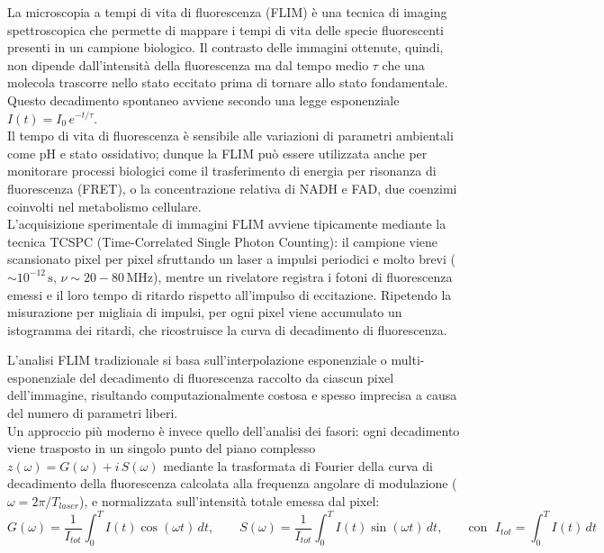 \documentclass[a4paper, 11pt]{article}
\begin{document}
La microscopia a tempi di vita di fluorescenza (FLIM) è una tecnica di imaging spettroscopica che permette di mappare i tempi di vita delle specie fluorescenti presenti in un campione biologico. Il contrasto delle immagini ottenute, quindi, non dipende dall'intensità della fluorescenza ma dal tempo medio $\tau$ che una molecola trascorre nello stato eccitato prima di tornare allo stato fondamentale. Questo decadimento spontaneo avviene secondo una legge esponenziale $I(t)=I_0\,e^{-t/\tau}$.\\
Il tempo di vita di fluorescenza è sensibile alle variazioni di parametri ambientali come pH e stato ossidativo; dunque la FLIM può essere utilizzata anche per monitorare processi biologici come il trasferimento di energia per risonanza di fluorescenza (FRET), o la concentrazione relativa di NADH e FAD, due coenzimi coinvolti nel metabolismo cellulare.\\
L'acquisizione sperimentale di immagini FLIM avviene tipicamente mediante la tecnica TCSPC (Time-Correlated Single Photon Counting): il campione viene scansionato pixel per pixel sfruttando un laser a impulsi periodici e molto brevi ($\sim10^{-12}\,\text{s}$, $\nu \sim 20-80\,\text{MHz}$), mentre un rivelatore registra i fotoni di fluorescenza emessi e il loro tempo di ritardo rispetto all'impulso di eccitazione.
Ripetendo la misurazione per migliaia di impulsi, per ogni pixel viene accumulato un istogramma dei ritardi, che ricostruisce la curva di decadimento di fluorescenza.

L'analisi FLIM tradizionale si basa sull'interpolazione esponenziale o multi-esponenziale del decadimento di fluorescenza raccolto da ciascun pixel dell'immagine, risultando computazionalmente costosa e spesso imprecisa a causa del numero di parametri liberi.\\
Un approccio più moderno è invece quello dell'analisi dei fasori: ogni decadimento viene trasposto in un singolo punto del piano complesso $z(\omega) = G(\omega) + i\,S(\omega)$ mediante la trasformata di Fourier della curva di decadimento della fluorescenza calcolata alla frequenza angolare di modulazione ($\omega =2\pi/T_{laser}$), e normalizzata sull'intensità totale emessa dal pixel:
\vspace{-5pt}
\[
G(\omega) = \frac{1}{I_{tot}} \int_0^{T} I(t) \cos(\omega t)\,dt, \qquad 
S(\omega) = \frac{1}{I_{tot}} \int_0^{T} I(t) \sin(\omega t)\,dt, \qquad 
\text{con }\;I_{tot} = \int_0^{T} I(t)\,dt
\]
\vspace{-22pt}
\end{document}
